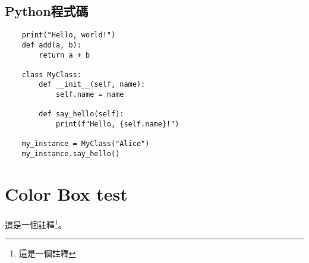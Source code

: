 \documentclass[12pt]{article}
\begin{document}
\subsection{Python程式碼}
\begin{verbatim}
    print("Hello, world!")
    def add(a, b):
        return a + b

    class MyClass:
        def __init__(self, name):
            self.name = name

        def say_hello(self):
            print(f"Hello, {self.name}!")

    my_instance = MyClass("Alice")
    my_instance.say_hello()
\end{verbatim}

\section{Color Box test}

\ex{}{}

\thm{}{}



這是一個註釋\footnote{這是一個註釋}。

\nocite{*}


\end{document}
